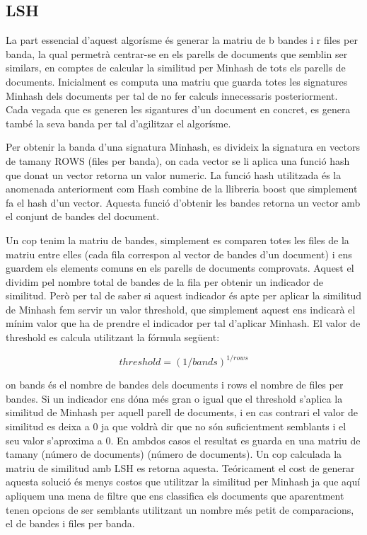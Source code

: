 \documentclass[catalan, 12pt]{report}
\begin{document}
\subsection{LSH}

La part essencial d'aquest algorísme és generar la matriu de b bandes i r files per banda, la qual permetrà centrar-se en els parells de documents que semblin ser similars, en comptes de calcular la similitud per Minhash de tots els parells de documents. Inicialment es computa una matriu que guarda totes les signatures Minhash dels documents per tal de no fer calculs innecessaris posteriorment. Cada vegada que es generen les sigantures d'un document en concret, es genera també la seva banda per tal d'agilitzar el algorísme. \newline

Per obtenir la banda d'una signatura Minhash, es divideix la signatura en vectors de tamany ROWS (files per banda), on cada vector se li aplica una funció hash que donat un vector retorna un valor numeric. La funció hash utilitzada és la anomenada anteriorment com Hash combine de la llibreria boost que simplement fa el hash d'un vector. Aquesta funció d'obtenir les bandes retorna un vector amb el conjunt de bandes del document. \newline

Un cop tenim la matriu de bandes, simplement es comparen totes les files de la matriu entre elles (cada fila correspon al vector de bandes d'un document) i ens guardem els elements comuns en els parells de documents comprovats. Aquest el dividim pel nombre total de bandes de la fila per obtenir un indicador de similitud. Però per tal de saber si aquest indicador és apte per aplicar la similitud de Minhash fem servir un valor threshold, que simplement aquest ens indicarà el mínim valor que ha de prendre el indicador per tal d'aplicar Minhash.
El valor de threshold es calcula utilitzant la fórmula següent:

\[threshold = (1 / bands)^{1 / rows}\]

on bands és el nombre de bandes dels documents i rows el nombre de files per bandes.
Si un indicador ens dóna més gran o igual que el threshold s'aplica la similitud de Minhash per aquell parell de documents, i en cas contrari el valor de similitud es deixa a 0 ja que voldrà dir que no són suficientment semblants i el seu valor s'aproxima a 0. En ambdos casos el resultat es guarda en una matriu de tamany (número de documents) (número de documents). \newline
Un cop calculada la matriu de similitud amb LSH es retorna aquesta. Teóricament el cost de generar aquesta solució és menys costos que utilitzar la similitud per Minhash ja que aquí apliquem una mena de filtre que ens classifica els documents que aparentment tenen opcions de ser semblants utilitzant un nombre més petit de comparacions, el de bandes i files per banda.
\end{document}
